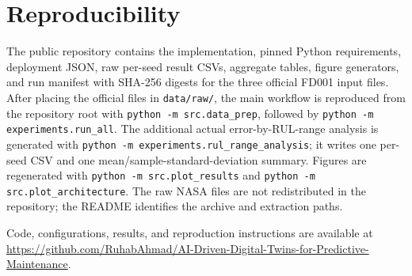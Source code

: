 ﻿\documentclass[conference]{IEEEtran}
\begin{document}
\section*{Reproducibility}
The public repository contains the implementation, pinned Python requirements, deployment JSON, raw per-seed result CSVs, aggregate tables, figure generators, and run manifest with SHA-256 digests for the three official FD001 input files. After placing the official files in \texttt{data/raw/}, the main workflow is reproduced from the repository root with \texttt{python -m src.data\_prep}, followed by \texttt{python -m experiments.run\_all}. The additional actual error-by-RUL-range analysis is generated with \texttt{python -m experiments.rul\_range\_analysis}; it writes one per-seed CSV and one mean/sample-standard-deviation summary. Figures are regenerated with \texttt{python -m src.plot\_results} and \texttt{python -m src.plot\_architecture}. The raw NASA files are not redistributed in the repository; the README identifies the archive and extraction paths.

Code, configurations, results, and reproduction instructions are available at \url{https://github.com/RuhabAhmad/AI-Driven-Digital-Twins-for-Predictive-Maintenance}.
\end{document}
